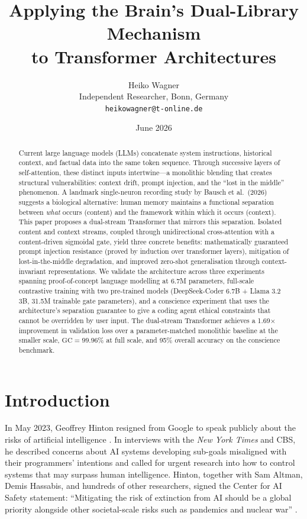 \documentclass[11pt,a4paper]{article}
\title{Applying the Brain's Dual-Library Mechanism\\to Transformer Architectures}
\author{Heiko Wagner\\
  \small Independent Researcher, Bonn, Germany\\
  \small \texttt{heikowagner@t-online.de}
}
\date{June 2026}
\theoremstyle{definition}
\begin{document}
\maketitle

\begin{abstract}
Current large language models (LLMs) concatenate system instructions, historical context, and factual data into the same token sequence. Through successive layers of self-attention, these distinct inputs intertwine---a monolithic blending that creates structural vulnerabilities: context drift, prompt injection, and the ``lost in the middle'' phenomenon. A landmark single-neuron recording study by Bausch et al.\ (2026) \cite{bausch2026distinct} suggests a biological alternative: human memory maintains a functional separation between \emph{what} occurs (content) and the framework within which it occurs (context). This paper proposes a dual-stream Transformer that mirrors this separation. Isolated content and context streams, coupled through unidirectional cross-attention with a content-driven sigmoidal gate, yield three concrete benefits: mathematically guaranteed prompt injection resistance (proved by induction over transformer layers), mitigation of lost-in-the-middle degradation, and improved zero-shot generalisation through context-invariant representations. We validate the architecture across three experiments spanning proof-of-concept language modelling at 6.7M parameters, full-scale contrastive training with two pre-trained models (DeepSeek-Coder 6.7B + Llama 3.2 3B, 31.5M trainable gate parameters), and a conscience experiment that uses the architecture's separation guarantee to give a coding agent ethical constraints that cannot be overridden by user input. The dual-stream Transformer achieves a 1.69$\times$ improvement in validation loss over a parameter-matched monolithic baseline at the smaller scale, $\text{GC} = 99.96\%$ at full scale, and 95\% overall accuracy on the conscience benchmark.
\end{abstract}

\section{Introduction}

In May 2023, Geoffrey Hinton resigned from Google to speak publicly about the risks of artificial intelligence \cite{hinton2023godfather}. In interviews with the \emph{New York Times} and CBS, he described concerns about AI systems developing sub-goals misaligned with their programmers' intentions and called for urgent research into how to control systems that may surpass human intelligence. Hinton, together with Sam Altman, Demis Hassabis, and hundreds of other researchers, signed the Center for AI Safety statement: ``Mitigating the risk of extinction from AI should be a global priority alongside other societal-scale risks such as pandemics and nuclear war'' \cite{cais2023statement}.
\end{document}
